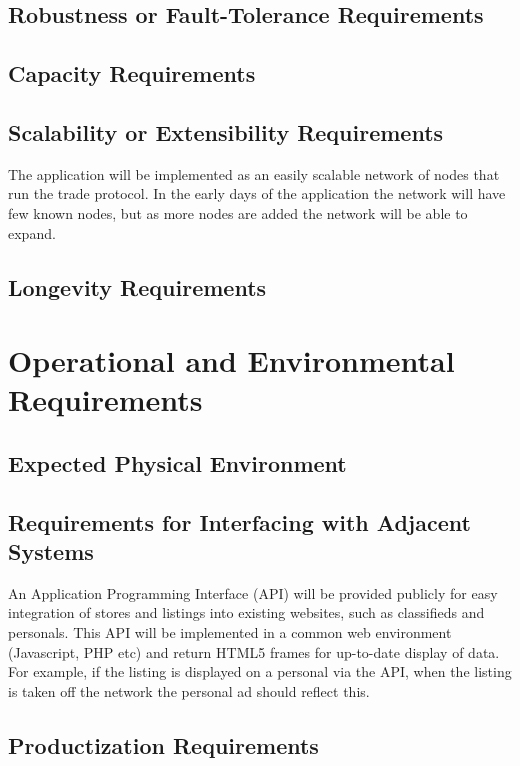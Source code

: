 \documentclass{article}
\begin{document}
\subsection{Robustness or Fault-Tolerance Requirements}


\subsection{Capacity Requirements}


\subsection{Scalability or Extensibility Requirements}
The application will be implemented as an easily scalable network of nodes that run the trade protocol. In the early days of the application the network will have few known nodes, but as more nodes are added the network will be able to expand. 

\subsection{Longevity Requirements}

\section{Operational and Environmental Requirements}

\subsection{Expected Physical Environment}


\subsection{Requirements for Interfacing with Adjacent Systems}
An Application Programming Interface (API) will be provided publicly for easy integration of stores and listings into existing websites, such as classifieds and personals. This API will be implemented in a common web environment (Javascript, PHP etc) and return HTML5 frames for up-to-date display of data. For example, if the listing is displayed on a personal via the API, when the listing is taken off the network the personal ad should reflect this.

\subsection{Productization Requirements}
\end{document}
